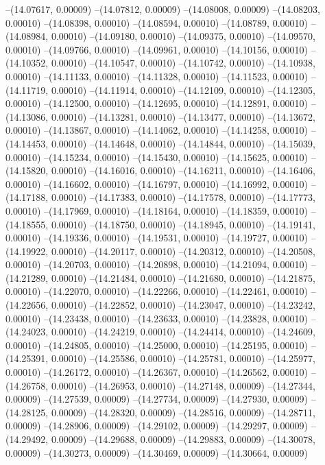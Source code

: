 --(14.07617, 0.00009)
--(14.07812, 0.00009)
--(14.08008, 0.00009)
--(14.08203, 0.00010)
--(14.08398, 0.00010)
--(14.08594, 0.00010)
--(14.08789, 0.00010)
--(14.08984, 0.00010)
--(14.09180, 0.00010)
--(14.09375, 0.00010)
--(14.09570, 0.00010)
--(14.09766, 0.00010)
--(14.09961, 0.00010)
--(14.10156, 0.00010)
--(14.10352, 0.00010)
--(14.10547, 0.00010)
--(14.10742, 0.00010)
--(14.10938, 0.00010)
--(14.11133, 0.00010)
--(14.11328, 0.00010)
--(14.11523, 0.00010)
--(14.11719, 0.00010)
--(14.11914, 0.00010)
--(14.12109, 0.00010)
--(14.12305, 0.00010)
--(14.12500, 0.00010)
--(14.12695, 0.00010)
--(14.12891, 0.00010)
--(14.13086, 0.00010)
--(14.13281, 0.00010)
--(14.13477, 0.00010)
--(14.13672, 0.00010)
--(14.13867, 0.00010)
--(14.14062, 0.00010)
--(14.14258, 0.00010)
--(14.14453, 0.00010)
--(14.14648, 0.00010)
--(14.14844, 0.00010)
--(14.15039, 0.00010)
--(14.15234, 0.00010)
--(14.15430, 0.00010)
--(14.15625, 0.00010)
--(14.15820, 0.00010)
--(14.16016, 0.00010)
--(14.16211, 0.00010)
--(14.16406, 0.00010)
--(14.16602, 0.00010)
--(14.16797, 0.00010)
--(14.16992, 0.00010)
--(14.17188, 0.00010)
--(14.17383, 0.00010)
--(14.17578, 0.00010)
--(14.17773, 0.00010)
--(14.17969, 0.00010)
--(14.18164, 0.00010)
--(14.18359, 0.00010)
--(14.18555, 0.00010)
--(14.18750, 0.00010)
--(14.18945, 0.00010)
--(14.19141, 0.00010)
--(14.19336, 0.00010)
--(14.19531, 0.00010)
--(14.19727, 0.00010)
--(14.19922, 0.00010)
--(14.20117, 0.00010)
--(14.20312, 0.00010)
--(14.20508, 0.00010)
--(14.20703, 0.00010)
--(14.20898, 0.00010)
--(14.21094, 0.00010)
--(14.21289, 0.00010)
--(14.21484, 0.00010)
--(14.21680, 0.00010)
--(14.21875, 0.00010)
--(14.22070, 0.00010)
--(14.22266, 0.00010)
--(14.22461, 0.00010)
--(14.22656, 0.00010)
--(14.22852, 0.00010)
--(14.23047, 0.00010)
--(14.23242, 0.00010)
--(14.23438, 0.00010)
--(14.23633, 0.00010)
--(14.23828, 0.00010)
--(14.24023, 0.00010)
--(14.24219, 0.00010)
--(14.24414, 0.00010)
--(14.24609, 0.00010)
--(14.24805, 0.00010)
--(14.25000, 0.00010)
--(14.25195, 0.00010)
--(14.25391, 0.00010)
--(14.25586, 0.00010)
--(14.25781, 0.00010)
--(14.25977, 0.00010)
--(14.26172, 0.00010)
--(14.26367, 0.00010)
--(14.26562, 0.00010)
--(14.26758, 0.00010)
--(14.26953, 0.00010)
--(14.27148, 0.00009)
--(14.27344, 0.00009)
--(14.27539, 0.00009)
--(14.27734, 0.00009)
--(14.27930, 0.00009)
--(14.28125, 0.00009)
--(14.28320, 0.00009)
--(14.28516, 0.00009)
--(14.28711, 0.00009)
--(14.28906, 0.00009)
--(14.29102, 0.00009)
--(14.29297, 0.00009)
--(14.29492, 0.00009)
--(14.29688, 0.00009)
--(14.29883, 0.00009)
--(14.30078, 0.00009)
--(14.30273, 0.00009)
--(14.30469, 0.00009)
--(14.30664, 0.00009)
